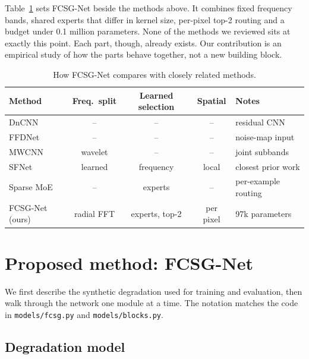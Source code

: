 \documentclass[12pt,a4paper,oneside]{NITR}
\newcommand{\fcsg}{FCSG-Net}
\begin{document}
Table~\ref{tab:gap} sets \fcsg{} beside the methods above. It combines fixed
frequency bands, shared experts that differ in kernel size, per-pixel top-2
routing and a budget under 0.1 million parameters. None of the methods we
reviewed sits at exactly this point. Each part, though, already exists. Our
contribution is an empirical study of how the parts behave together, not a
new building block.

\begin{table}[htbp]
	\centering
	\caption{How \fcsg{} compares with closely related methods.}
	\small
	\label{tab:gap}
	\begin{tabular}{@{}lcccl@{}}
		\toprule
		Method & Freq.\ split & Learned selection & Spatial & Notes \\
		\midrule
		DnCNN \cite{zhang2017dncnn}      & --         & --              & --        & residual CNN \\
		FFDNet \cite{zhang2018ffdnet}    & --         & --              & --        & noise-map input \\
		MWCNN \cite{liu2018mwcnn}        & wavelet    & --              & --        & joint subbands \\
		SFNet \cite{cui2023sfnet}        & learned    & frequency       & local     & closest prior work \\
		Sparse MoE \cite{shazeer2017moe} & --         & experts         & --        & per-example routing \\
		\fcsg{} (ours)                   & radial FFT & experts, top-2  & per pixel & 97k parameters \\
		\bottomrule
	\end{tabular}
\end{table}

\thispagestyle{empty}\cleardoublepage
\chapter{Proposed method: \fcsg}\label{ch:method}

We first describe the synthetic degradation used for training and
evaluation, then walk through the network one module at a time. The notation
matches the code in \texttt{models/fcsg.py} and \texttt{models/blocks.py}.

\section{Degradation model}\label{sec:degradation}
\end{document}
